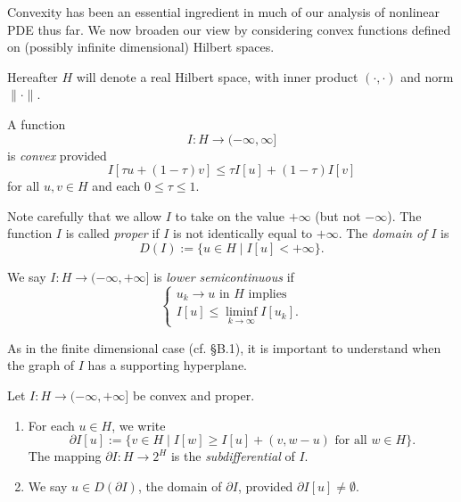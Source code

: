 Convexity has been an essential ingredient in much of our analysis of nonlinear PDE thus far. We now broaden our view by considering convex functions defined on (possibly infinite dimensional) Hilbert spaces.

Hereafter $H$ will denote a real Hilbert space, with inner product $(\cdot, \cdot)$ and norm $\|\cdot\|$.

\begin{definition}
\label{def:convex-function-hilbert-space}
A function
\[
I : H \to (-\infty, \infty]
\]
is \textit{convex} provided
\[
I[\tau u + (1-\tau)v] \le \tau I[u] + (1-\tau)I[v]
\]
for all $u, v \in H$ and each $0 \le \tau \le 1$.
\end{definition}

Note carefully that we allow $I$ to take on the value $+\infty$ (but not $-\infty$). The function $I$ is called \textit{proper} if $I$ is not identically equal to $+\infty$. The \textit{domain of} $I$ is
\[
D(I) := \{u \in H \mid I[u] < +\infty\}.
\]

\begin{definition}
\label{def:lower-semicontinuous-hilbert-functional}
We say $I : H \to (-\infty, +\infty]$ is \textit{lower semicontinuous} if
\[
\begin{cases} u_k \to u \text{ in } H \text{ implies} \\ I[u] \le \liminf_{k \to \infty} I[u_k]. \end{cases}
\]
\end{definition}

As in the finite dimensional case (cf. \S B.1), it is important to understand when the graph of $I$ has a supporting hyperplane.

\begin{definition}[Subdifferential]
\label{def:subdifferential-hilbert}
Let $I : H \to (-\infty, +\infty]$ be convex and proper.
\begin{enumerate}
\item[(i)] For each $u \in H$, we write
\[
\partial I[u] := \{v \in H \mid I[w] \ge I[u] + (v, w-u) \text{ for all } w \in H\}.
\tag{1}
\]
The mapping $\partial I : H \to 2^H$ is the \textit{subdifferential} of $I$.
\item[(ii)] We say $u \in D(\partial I)$, the domain of $\partial I$, provided $\partial I[u] \ne \emptyset$.
\end{enumerate}
\end{definition}

